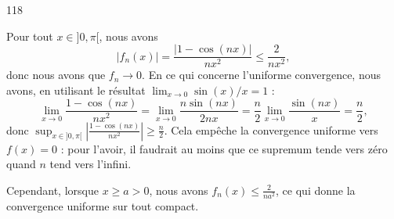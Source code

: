 

\begin{corrige}{118}

Pour tout $x\in]0,\pi[$, nous avons
\begin{equation}
	| f_n(x) |=\frac{ | 1-\cos(nx) | }{ nx^2 }\leq\frac{ 2 }{ nx^2 },
\end{equation}
donc nous avons que $f_n\to 0$. En ce qui concerne l'uniforme convergence, nous avons, en utilisant le résultat $\lim_{x\to 0}\sin(x)/x=1$ :
\begin{equation}
	\lim_{x\to 0}\frac{ 1-\cos(nx) }{ nx^2 }=\lim_{x\to 0}\frac{ n\sin(nx) }{ 2nx }=\frac{ n }{ 2 }\lim_{x\to 0}\frac{ \sin(nx) }{ x }=\frac{n}{ 2 },
\end{equation}
donc $\sup_{x\in ]0,\pi[}\left| \frac{ 1-\cos(nx) }{ nx^2 }\right|\geq \frac{n}{ 2 }$. Cela empêche la convergence uniforme vers $f(x)=0$ : pour l'avoir, il faudrait au moins que ce supremum tende vers zéro quand $n$ tend vers l'infini.

Cependant, lorsque $x\geq a>0$, nous avons $f_n(x)\leq\frac{ 2 }{ na^2 }$, ce qui donne la convergence uniforme sur tout compact.

\end{corrige}

